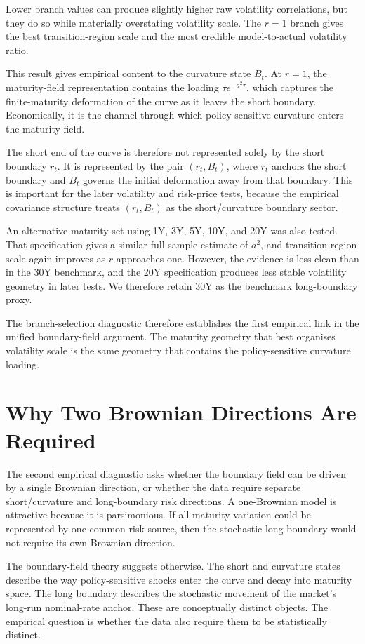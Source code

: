 \documentclass[11pt]{article}
\begin{document}
Lower branch values can produce slightly higher raw volatility correlations, but they do so while materially overstating volatility scale. The $r=1$ branch gives the best transition-region scale and the most credible model-to-actual volatility ratio.

This result gives empirical content to the curvature state $B_t$. At $r=1$, the maturity-field representation contains the loading $\tau e^{-a^2\tau}$, which captures the finite-maturity deformation of the curve as it leaves the short boundary. Economically, it is the channel through which policy-sensitive curvature enters the maturity field.

The short end of the curve is therefore not represented solely by the short boundary $r_t$. It is represented by the pair $(r_t,B_t)$, where $r_t$ anchors the short boundary and $B_t$ governs the initial deformation away from that boundary. This is important for the later volatility and risk-price tests, because the empirical covariance structure treats $(r_t,B_t)$ as the short/curvature boundary sector.

An alternative maturity set using 1Y, 3Y, 5Y, 10Y, and 20Y was also tested. That specification gives a similar full-sample estimate of $a^2$, and transition-region scale again improves as $r$ approaches one. However, the evidence is less clean than in the 30Y benchmark, and the 20Y specification produces less stable volatility geometry in later tests. We therefore retain 30Y as the benchmark long-boundary proxy.

The branch-selection diagnostic therefore establishes the first empirical link in the unified boundary-field argument. The maturity geometry that best organises volatility scale is the same geometry that contains the policy-sensitive curvature loading.

\section{Why Two Brownian Directions Are Required}

The second empirical diagnostic asks whether the boundary field can be driven by a single Brownian direction, or whether the data require separate short/curvature and long-boundary risk directions. A one-Brownian model is attractive because it is parsimonious. If all maturity variation could be represented by one common risk source, then the stochastic long boundary would not require its own Brownian direction.

The boundary-field theory suggests otherwise. The short and curvature states describe the way policy-sensitive shocks enter the curve and decay into maturity space. The long boundary describes the stochastic movement of the market's long-run nominal-rate anchor. These are conceptually distinct objects. The empirical question is whether the data also require them to be statistically distinct.
\end{document}
